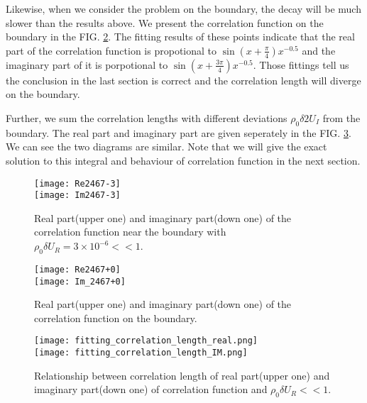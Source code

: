 \documentclass[aps,onecolumn,nofootinbib,superscriptaddress,notitlepage,longbibliography]{revtex4-1}
\begin{document}
Likewise, when we consider the problem on the boundary, the decay
will be much slower than the results above. We present the correlation
function on the boundary in the FIG. \ref{fig2}. The fitting results
of these points indicate that the real part of the correlation function
is propotional to $\sin(x+\frac{\pi}{4})x^{-0.5}$ and the imaginary
part of it is porpotional to $\sin(x+\frac{3\pi}{4})x^{-0.5}$. Those
fittings tell us the conclusion in the last section is correct and
the correlation length will diverge on the boundary.

Further, we sum the correlation lengths with different deviations
$\rho_{0}\delta2U_{I}$ from the boundary. The real part and imaginary
part are given seperately in the FIG. \ref{fig3}. We can see the
two diagrams are similar. Note that we will give the exact solution
to this integral and behaviour of correlation function in the next
section.

\begin{figure}[t]
\centering \texttt{[image: Re2467-3]}\phantom{AAA}\\
 \texttt{[image: Im2467-3]}\phantom{AAA}\\
 \caption{Real part(upper one) and imaginary part(down one) of the correlation
function near the boundary with $\rho_{0}\delta U_{R}=3\times10^{-6}<<1$.}
\label{fig1} 
\end{figure}

\begin{figure}
\centering \texttt{[image: Re2467+0]}\phantom{AAA}\\
 \texttt{[image: Im\_2467+0]}\phantom{AAA}\\
 \caption{Real part(upper one) and imaginary part(down one) of the correlation
function on the boundary.}
\label{fig2} 
\end{figure}

\begin{figure}
\centering \texttt{[image: fitting\_correlation\_length\_real.png]}\\
 \texttt{[image: fitting\_correlation\_length\_IM.png]}\\
 \caption{Relationship between correlation length of real part(upper one) and
imaginary part(down one) of correlation function and $\rho_{0}\delta U_{R}<<1$.}
\label{fig3} 
\end{figure}
\end{document}

